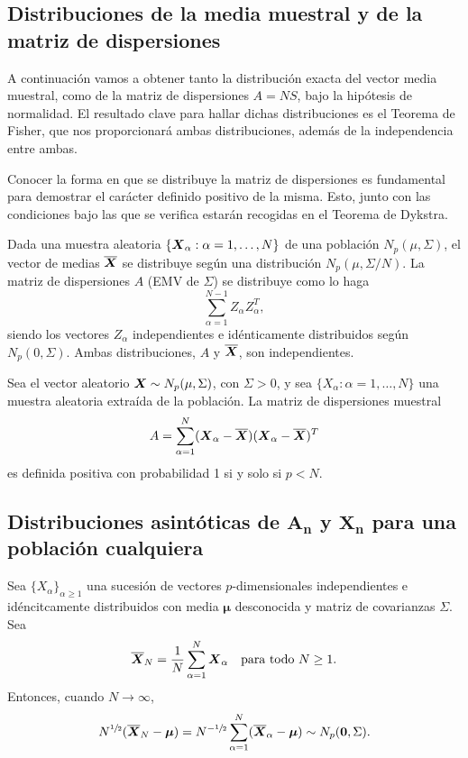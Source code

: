 \subsection{Distribuciones de la media muestral y de la matriz de dispersiones}

A continuación vamos a obtener tanto la distribución exacta del vector media muestral, como de la matriz de dispersiones \(A = NS\), bajo la hipótesis de normalidad.
El resultado clave para hallar dichas distribuciones es el Teorema de Fisher, que nos proporcionará ambas distribuciones, además de la independencia entre ambas. 

Conocer la forma en que se distribuye la matriz de dispersiones es fundamental para demostrar el carácter definido positivo de la misma. 
Esto, junto con las condiciones bajo las que se verifica estarán recogidas en el Teorema de Dykstra.

\begin{nth}
  Dada una muestra aleatoria $\{\boldsymbol{X}_\alpha: \alpha = 1,\dots,N\}$ de una población $N_p(\mu,\Sigma)$, el vector de medias $\overline{\boldsymbol{X}}$ se distribuye según una distribución $N_p\left(\mu,\Sigma/N\right)$.
  La matriz de dispersiones $A$ (EMV de $\Sigma$) se distribuye como lo haga
  \[
    \sum_{\alpha =1}^{N-1} Z_\alpha Z_\alpha^T,
  \]
  siendo los vectores $Z_\alpha$ independientes e idénticamente distribuidos según $N_p(0,\Sigma)$.
  Ambas distribuciones, $A$ y $\overline{\boldsymbol{X}}$, son independientes.
\end{nth}

\begin{nth}
  Sea el vector aleatorio $\boldsymbol{X} \sim N_p(\mu,\Sigma)$, con $\Sigma > 0$, y sea $\{X_\alpha : \alpha = 1,\dots,N\}$ una muestra aleatoria extraída de la población. La matriz de dispersiones muestral
  \[
    A = \sum_{\alpha = 1}^N (\boldsymbol{X}_\alpha - \overline{\boldsymbol{X}})(\boldsymbol{X}_\alpha - \overline{\boldsymbol{X}})^T
  \]
  es definida positiva con probabilidad 1 si y solo si $p<N$.
\end{nth}

\subsection{Distribuciones asintóticas de \texorpdfstring{$\boldsymbol A_{\boldsymbol n}$}{An} y \texorpdfstring{$\boldsymbol X_{\boldsymbol n}$}{Xn} para una población cualquiera}

\begin{nprop}
  Sea \(\{X_{\alpha}\}_{\alpha \geq 1}\) una sucesión de vectores \(p\)-dimensionales independientes e idéncitcamente distribuidos con media \(\boldsymbol \mu\) desconocida y matriz de covarianzas \(\Sigma\). Sea \[
    \overline{\boldsymbol{X}}_N = \frac{1}{N}\sum_{\alpha = 1}^{N}\boldsymbol{X}_{\alpha} \quad \text{para todo } N \geq 1.
  \]
  Entonces, cuando \(N \to \infty\), \[
    N^{\sfrac{1}{2}}(\overline{\boldsymbol{X}}_N - \boldsymbol \mu) = N^{-\sfrac{1}{2}}\sum_{\alpha = 1}^{N}(\overline{\boldsymbol{X}}_{\alpha} - \boldsymbol \mu) \sim N_p(\boldsymbol 0, \Sigma).
  \]
\end{nprop}

